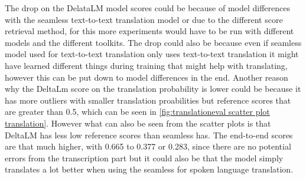 The drop on the DelataLM model scores could be because of model differences with the seamless text-to-text translation model or due to the different score retrieval method, for this more experiments would have to be run with different models and the different toolkits. 
The drop could also be because even if seamless model used for text-to-text translation only uses text-to-text translation it might have learned different things during training that might help with translating, however this can be put down to model differences in the end. 
Another reason why the DeltaLm score on the translation probability is lower could be because it has more outliers with smaller translation proabilities but reference scores that are greater than 0.5, which can be seen in \autoref{fig:translationeval scatter plot translation}. However what can also be seen from the scatter plots is that DeltaLM has less low reference scores than seamless has. 
The end-to-end scores are that much higher, with 0.665 to 0.377 or 0.283, since there are no potential errors from the transcription part but it could also be that the model simply translates a lot better when using the seamless for spoken language translation. 

